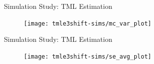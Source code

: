 \documentclass{beamer}
\begin{document}

\begin{frame}[c]{Simulation Study: TML Estimation}

\vspace{-0.45em}
\begin{figure}\label{fig:tmle3shift-mcvar}
  \centering
  \texttt{[image: tmle3shift-sims/mc\_var\_plot]}
\end{figure}

\note{
}

\end{frame}


\begin{frame}[c]{Simulation Study: TML Estimation}

\vspace{-0.45em}
\begin{figure}\label{fig:tmle3shift-avgse}
  \centering
  \texttt{[image: tmle3shift-sims/se\_avg\_plot]}
\end{figure}

\note{
}

\end{frame}

\end{document}
